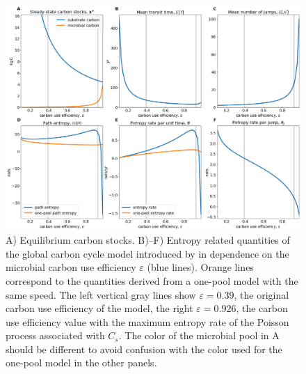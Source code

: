\documentclass[smallextended]{svjour3}
\begin{document}
\begin{figure}[htbp]
    \centering
    \includegraphics[width=1.0\linewidth]{figs/Wang_entropies.png}
    \caption{A) Equilibrium carbon stocks.
    B)--F) Entropy related quantities of the global carbon cycle model introduced by \citet{Wang2014BG} in dependence on the microbial carbon use efficiency $\varepsilon$ (blue lines).
    Orange lines correspond to the quantities derived from a one-pool model with the same speed.
    The left vertical gray lines show $\varepsilon=0.39$, the original carbon use efficiency of the model, the right $\varepsilon=0.926$, the carbon use efficiency value with the maximum entropy rate of the Poisson process associated with $C_s$. \color{blue} The color of the microbial pool in A should be different to avoid confusion with the color used for the one-pool model in the other panels. }
    \label{fig:Wang_entropies}
\end{figure}
\end{document}
